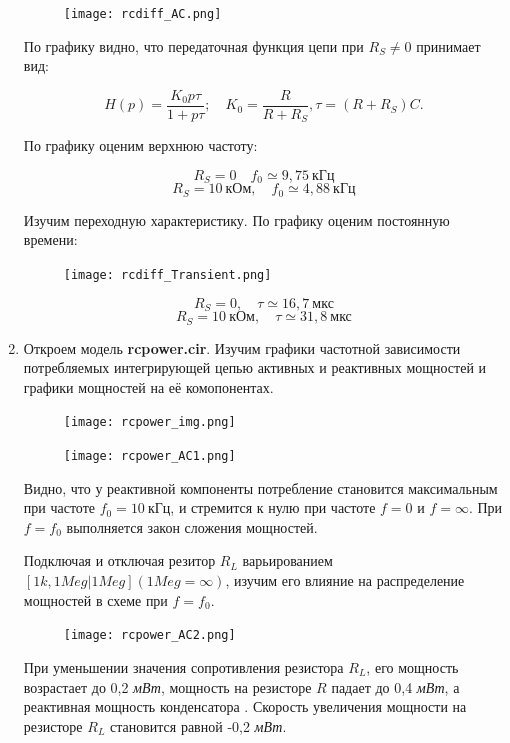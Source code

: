 \documentclass[a4paper, 12pt]{article}%
\begin{document}
\begin{enumerate}
\begin{figure}[h!]
\centering
\texttt{[image: rcdiff\_AC.png]}
\label{fig:Image1}
\end{figure}

По графику видно, что передаточная функция цепи при $R_S \neq 0$ принимает вид:

\[H(p) = \frac{K_0p\tau}{1 + p\tau}; \quad K_0 = \frac{R}{R + R_S},\tau = (R + R_S) C.\]

По графику оценим верхнюю частоту:

\[R_S = 0 \quad f_0 \simeq 9,75 \: \textit{кГц}\]
\[R_S = 10 \: \textit{кОм}, \quad f_0 \simeq 4,88 \: \textit{кГц}\]

Изучим переходную характеристику. По графику оценим постоянную времени:

\begin{figure}[h!]
\centering
\texttt{[image: rcdiff\_Transient.png]}
\label{fig:Image1}
\end{figure}

\[R_S = 0, \quad \tau \simeq 16,7 \: \textit{мкс}\]
\[R_S = 10 \: \textit{кОм}, \quad \tau \simeq 31,8 \: \textit{мкс}\]

\item Откроем модель \textbf{rcpower.cir}. Изучим графики частотной зависимости потребляемых интегрирующей цепью активных и реактивных мощностей и графики мощностей на её комопонентах.

\begin{figure}[h!]
\centering
\texttt{[image: rcpower\_img.png]}
\label{fig:Image1}
\end{figure}

\begin{figure}[h!]
\centering
\texttt{[image: rcpower\_AC1.png]}
\label{fig:Image1}
\end{figure}

Видно, что у реактивной компоненты потребление становится максимальным при частоте $f_0 = 10 \: \textit{кГц}$, и стремится к нулю при частоте $f = 0$ и $f = \infty$. При $f = f_0$ выполняется закон сложения мощностей.

Подключая и отключая резитор $R_L$ варьированием $[1k, 1Meg \vert 1Meg] (1Meg = \infty)$, изучим его влияние на распределение мощностей в схеме при $f = f_0$.

\begin{figure}[h!]
\centering
\texttt{[image: rcpower\_AC2.png]}
\label{fig:Image1}
\end{figure}

При уменьшении значения сопротивления резистора $R_L$, его мощность возрастает до 0,2 \textit{мВт}, мощность на резисторе $R$ падает до 0,4 \textit{мВт}, а реактивная мощность конденсатора . Скорость увеличения мощности на резисторе $R_L$ становится равной -0,2 \textit{мВт}.

\end{enumerate}
\end{document}

